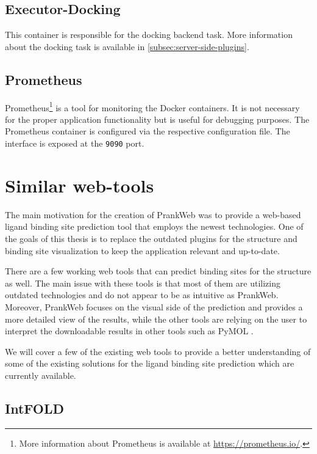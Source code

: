 \subsection{Executor-Docking}
\label{subsec:executor-docking}

This container is responsible for the docking backend task. More information about the docking task is available in \cref{subsec:server-side-plugins}.

\subsection{Prometheus}
\label{subsec:prometheus}

Prometheus\footnote{More information about Prometheus is available at \url{https://prometheus.io/}.} is a tool for monitoring the Docker containers. It is not necessary for the proper application functionality but is useful for debugging purposes. The Prometheus container is configured via the respective configuration file. The interface is exposed at the \texttt{9090} port.

\section{Similar web-tools}
\label{sec:similar_web_tools}

The main motivation for the creation of PrankWeb was to provide a web-based ligand binding site prediction tool that employs the newest technologies. One of the goals of this thesis is to replace the outdated plugins for the structure and binding site visualization to keep the application relevant and up-to-date.

There are a few working web tools that can predict binding sites for the structure as well. The main issue with these tools is that most of them are utilizing outdated technologies and do not appear to be as intuitive as PrankWeb\cite{jendele2019prankweb}. Moreover, PrankWeb focuses on the visual side of the prediction and provides a more detailed view of the results, while the other tools are relying on the user to interpret the downloadable results in other tools such as PyMOL \cite{delano2002pymol}.

We will cover a few of the existing web tools to provide a better understanding of some of the existing solutions for the ligand binding site prediction which are currently available.

\subsection{IntFOLD}
\label{subsec:intfold}

